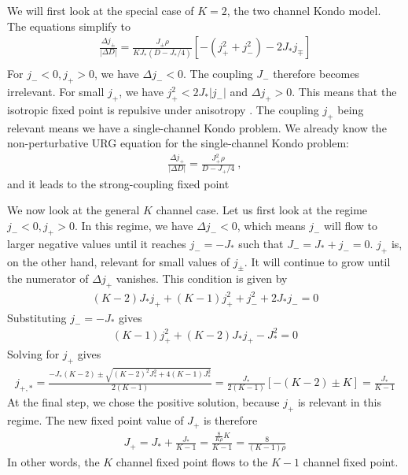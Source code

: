 \documentclass{revtex4-2}
\begin{document}
We will first look at the special case of \(K=2\), the two channel Kondo model. The equations simplify to
\begin{align}
	\frac{\Delta j_\pm}{|\Delta D|} = \frac{J_\pm \rho}{K J_*\left(D - J_*/4\right)}\left[- \left(j_+^2 + j_-^2\right) - 2J_* j_\mp\right]\\
\end{align}
For \(j_- < 0, j_+ > 0\), we have \(\Delta j_- < 0\). The coupling \(J_-\) therefore becomes irrelevant. For small \(j_+\), we have \(j_+^2 < 2J_* |j_-|\)  and \(\Delta j_+ > 0\). This means that the isotropic fixed point is repulsive under anisotropy \cite{Noz_blandin_1980}. The coupling \(j_+\) being relevant means we have a single-channel Kondo problem. We already know the non-perturbative URG equation for the single-channel Kondo problem:
\begin{align}
	\frac{\Delta j_+}{|\Delta D|} = \frac{J_+^2 \rho}{D - J_+/4}~,
\end{align}
and it leads to the strong-coupling fixed point

We now look at the general \(K\) channel case. Let us first look at the regime \(j_- < 0, j_+ > 0\). In this regime, we have \(\Delta j_- < 0\), which means \(j_-\) will flow to larger negative values until it reaches \(j_- = -J_*\) such that \(J_- = J_* + j_- = 0\). \(j_+\) is, on the other hand, relevant for small values of \(j_\pm\). It will continue to grow until the numerator of \(\Delta j_+\) vanishes. This condition is given by
\begin{align}
	\left(K - 2\right)J_*j_+ + (K-1)j_+^2 + j_-^2 + 2J_* j_- = 0
\end{align}
Substituting \(j_- = -J_*\) gives
\begin{align}
	(K-1)j_+^2 + \left(K - 2\right)J_*j_+ - J_*^2 = 0
\end{align}
Solving for \(j_+\) gives
\begin{align}
	j_{+,*} = \frac{-J_*(K-2) \pm \sqrt{(K-2)^2 J_*^2 + 4(K-1)J_*^2}}{2(K-1)} = \frac{J_*}{2(K-1)}\left[-(K-2) \pm K\right] = \frac{J_*}{K-1}
\end{align}
At the final step, we chose the positive solution, because \(j_+\) is relevant in this regime. The new fixed point value of \(J_+\) is therefore
\begin{align}
	J_+ = J_* + \frac{J_*}{K-1} = \frac{\frac{8}{K \rho} K}{K - 1} = \frac{8}{(K-1)\rho}
\end{align}
In other words, the \(K\) channel fixed point flows to the \(K-1\) channel fixed point.
\end{document}
